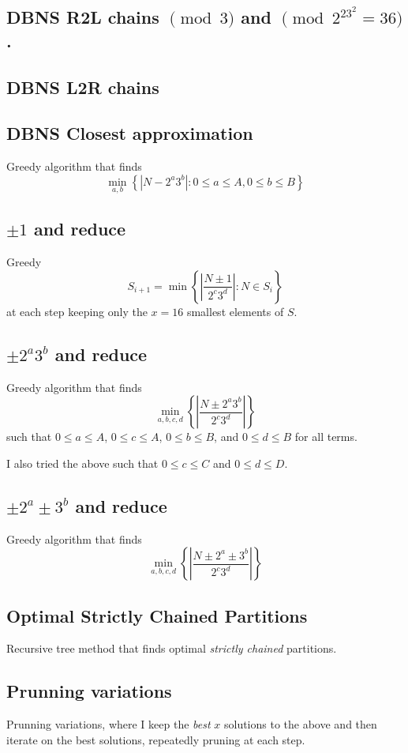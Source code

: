 \documentclass{ucalgthes1}
\theoremstyle{plain}
\theoremstyle{definition}
\begin{document}
\pagebreak

\subsection{DBNS R2L chains $\pmod 3$ and $\pmod {2^23^2 = 36}$.}
\subsection{DBNS L2R chains}
\subsection{DBNS Closest approximation}
Greedy algorithm that finds
\[
	\min_{a,b} \left\{|N-2^a3^b| : 0 \le a \le A, 0 \le b \le B\right\}
\]

\subsection{$\pm 1$ and reduce}
Greedy 
\[
	S_{i+1} = \min \left\{ \left| \frac{N \pm 1}{2^c3^d} \right| : N \in S_i \right\}
\]
at each step keeping only the $x=16$ smallest elements of $S$.

\subsection{$\pm 2^a3^b$ and reduce}
Greedy algorithm that finds
\[
	\min_{a,b,c,d} \left\{\left| \frac{N \pm 2^a3^b}{2^c3^d} \right| \right\}
\]
such that $0 \le a \le A$, $0 \le c \le A$, $0 \le b \le B$, and $0 \le d \le B$ for all terms.

I also tried the above such that $0 \le c \le C$ and $0 \le d \le D$.

\subsection{$\pm 2^a \pm 3^b$ and reduce}
Greedy algorithm that finds
\[
	\min_{a,b,c,d} \left\{\left| \frac{N \pm 2^a \pm 3^b}{2^c3^d} \right| \right\}
\]

\subsection{Optimal Strictly Chained Partitions}
Recursive tree method that finds optimal \emph{strictly chained} partitions.

\subsection{Prunning variations}
Prunning variations, where I keep the \emph{best} $x$ solutions to the above and then iterate on the best solutions, repeatedly pruning at each step.
\end{document}
